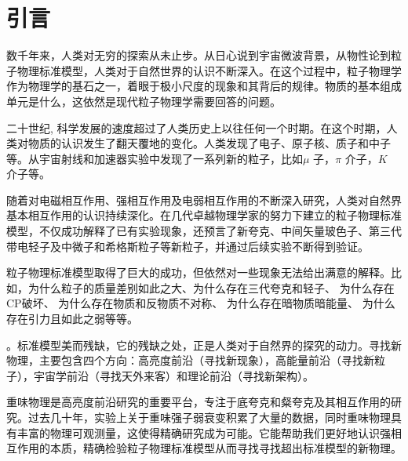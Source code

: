 \chapter{引言}

数千年来，人类对无穷的探索从未止步。从日心说到宇宙微波背景，从物性论到粒子物理标准模型，人类对于自然世界的认识不断深入。在这个过程中，粒子物理学作为物理学的基石之一，着眼于极小尺度的现象和其背后的规律。物质的基本组成单元是什么，这依然是现代粒子物理学需要回答的问题。

二十世纪, 科学发展的速度超过了人类历史上以往任何一个时期。在这个时期，人类对物质的认识发生了翻天覆地的变化。人类发现了电子、原子核、质子和中子等\cite{stoney1881lii, rutherford2012scattering, rutherford2010collision, chadwick1932possible}。从宇宙射线和加速器实验中发现了一系列新的粒子，比如$\mu$ 子，$\pi$ 介子，$K$ 介子等\cite{anderson1932energies,anderson1936cloud, anderson1952total, cowan1956detection, danby1962observation}。


随着对电磁相互作用、强相互作用\cite{yang1954conservation}及电弱相互作用\cite{glashow1961partial, salam1964electromagnetic, weinberg1967model}的不断深入研究，人类对自然界基本相互作用的认识持续深化。在几代卓越物理学家的努力下建立的粒子物理标准模型，不仅成功解释了已有实验现象，还预言了新夸克、中间矢量玻色子\cite{barber1979discovery, arnison1983experimental, arnison1983experimental01}、第三代带电轻子及中微子\cite{perl1975evidence,kodama2001observation}和希格斯粒子\cite{aad2012observation}等新粒子，并通过后续实验不断得到验证。

粒子物理标准模型取得了巨大的成功，但依然对一些现象无法给出满意的解释。比如，为什么粒子的质量差别如此之大、为什么存在三代夸克和轻子、 为什么存在CP破坏、 为什么存在物质和反物质不对称、 为什么存在暗物质暗能量、 为什么存在引力且如此之弱等等。

。标准模型美而残缺，它的残缺之处，正是人类对于自然界的探究的动力。寻找新物理，主要包含四个方向：高亮度前沿（寻找新现象），高能量前沿（寻找新粒子），宇宙学前沿（寻找天外来客）和理论前沿（寻找新架构）。

重味物理是高亮度前沿研究的重要平台，专注于底夸克和粲夸克及其相互作用的研究。过去几十年，实验上关于重味强子弱衰变积累了大量的数据，同时重味物理具有丰富的物理可观测量，这使得精确研究成为可能。它能帮助我们更好地认识强相互作用的本质，精确检验粒子物理标准模型从而寻找寻找超出标准模型的新物理。

